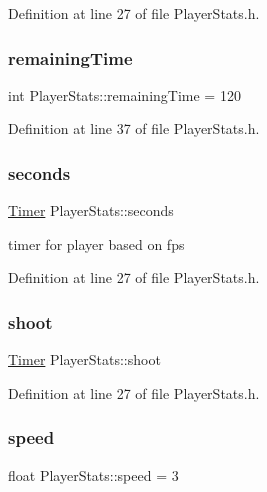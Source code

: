 Definition at line 27 of file Player\+Stats.\+h.

\mbox{\label{struct_player_stats_a42b7d05fe86a26230ff2b55bbe0489ad}} 
\subsubsection{\texorpdfstring{remaining\+Time}{remainingTime}}
{\footnotesize\ttfamily int Player\+Stats\+::remaining\+Time = 120}



Definition at line 37 of file Player\+Stats.\+h.

\mbox{\label{struct_player_stats_ac30ff0f8390f54929be9f378cd759c81}} 
\subsubsection{\texorpdfstring{seconds}{seconds}}
{\footnotesize\ttfamily \hyperlink{struct_timer}{Timer} Player\+Stats\+::seconds}

timer for player based on fps 

Definition at line 27 of file Player\+Stats.\+h.

\mbox{\label{struct_player_stats_a261129c34a506778d0b83ed5857263b6}} 
\subsubsection{\texorpdfstring{shoot}{shoot}}
{\footnotesize\ttfamily \hyperlink{struct_timer}{Timer} Player\+Stats\+::shoot}



Definition at line 27 of file Player\+Stats.\+h.

\mbox{\label{struct_player_stats_a19d6791dea891e37558e940dc486fef4}} 
\subsubsection{\texorpdfstring{speed}{speed}}
{\footnotesize\ttfamily float Player\+Stats\+::speed = 3}

